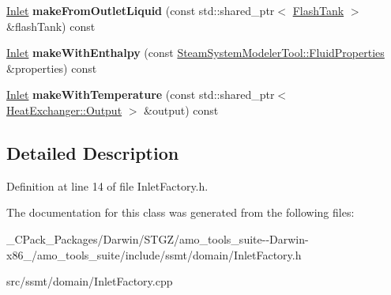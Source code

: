 \begin{DoxyCompactItemize}
\item 
\mbox{\label{class_inlet_factory_a74829dbddf317d0510bd4fceb408853e}} 
\hyperlink{class_inlet}{Inlet} {\bfseries make\+From\+Outlet\+Liquid} (const std\+::shared\+\_\+ptr$<$ \hyperlink{class_flash_tank}{Flash\+Tank} $>$ \&flash\+Tank) const
\item 
\mbox{\label{class_inlet_factory_a9bc3a8b4a15f7a486b8c64b757c23f6e}} 
\hyperlink{class_inlet}{Inlet} {\bfseries make\+With\+Enthalpy} (const \hyperlink{struct_steam_system_modeler_tool_1_1_fluid_properties}{Steam\+System\+Modeler\+Tool\+::\+Fluid\+Properties} \&properties) const
\item 
\mbox{\label{class_inlet_factory_a8d71dcd9f0e2b4df202542281659732d}} 
\hyperlink{class_inlet}{Inlet} {\bfseries make\+With\+Temperature} (const std\+::shared\+\_\+ptr$<$ \hyperlink{struct_heat_exchanger_1_1_output}{Heat\+Exchanger\+::\+Output} $>$ \&output) const
\end{DoxyCompactItemize}


\subsection{Detailed Description}


Definition at line 14 of file Inlet\+Factory.\+h.



The documentation for this class was generated from the following files\+:\begin{DoxyCompactItemize}
\item 
\+\_\+\+C\+Pack\+\_\+\+Packages/\+Darwin/\+S\+T\+G\+Z/amo\+\_\+tools\+\_\+suite-\/-\/\+Darwin-\/x86\+\_/amo\+\_\+tools\+\_\+suite/include/ssmt/domain/Inlet\+Factory.\+h\item 
src/ssmt/domain/Inlet\+Factory.\+cpp\end{DoxyCompactItemize}
